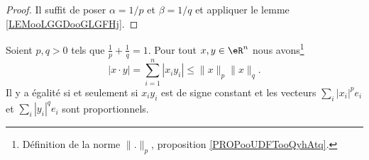 \begin{proof}
	Il suffit de poser \( \alpha=1/p\) et \( \beta=1/q\) et appliquer le lemme \ref{LEMooLGGDooGLGFHj}.
\end{proof}

\begin{theorem}        \label{THOooYHMJooBlXfpl}
    Soient \( p,q>0\) tels que \( \frac{1}{ p }+\frac{1}{ q }=1\). Pour tout \( x,y\in \eR^n\) nous avons\footnote{Définition de la norme \( \| . \|_p\), proposition \ref{PROPooUDFTooQyhAtq}.}
	\begin{equation}
		| x\cdot y |=\sum_{i=1}^n| x_iy_i |\leq \| x \|_p\| x \|_q.
	\end{equation}
    Il y a égalité si et seulement si \( x_iy_i\) est de signe constant et les vecteurs \( \sum_i| x_i |^pe_i\) et \( \sum_i| y_i |^qe_i\) sont proportionnels.
\end{theorem}

